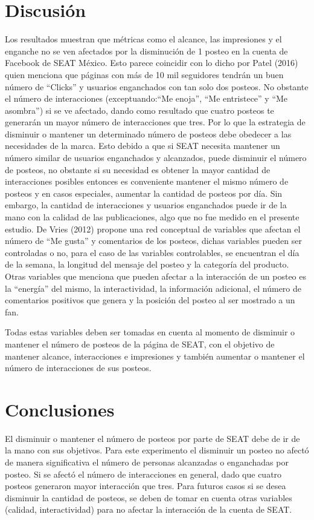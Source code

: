 \documentclass[a4paper,10pt]{article}
\begin{document}
\section{Discusión}
Los resultados muestran que métricas como el alcance, las impresiones y el enganche no
se ven afectados por la disminución de 1 posteo en la cuenta de Facebook de SEAT México. Esto parece coincidir
con lo dicho por Patel (2016) quien menciona que páginas con más de 10 mil seguidores tendrán un buen número
de ``Clicks'' y usuarios enganchados con tan solo dos posteos.
No obstante el número de interacciones (exceptuando:``Me enoja'', ``Me entristece'' y ``Me asombra'')
si se ve afectado, dando como resultado que cuatro posteos te generarán un mayor número de interacciones que tres.
Por lo que la estrategia de disminuir o mantener un determinado número  de posteos debe obedecer a las necesidades de la marca.
Esto debido a que si SEAT necesita mantener un  número similar  de usuarios enganchados y alcanzados,
puede disminuir el número de posteos, no obstante si su necesidad es obtener la mayor cantidad de interacciones posibles 
entonces es conveniente mantener el mismo número de posteos y en casos especiales, aumentar la cantidad de posteos por día.
Sin embargo, la cantidad de interacciones y usuarios enganchados puede ir de la mano con la calidad de las publicaciones, algo que 
no fue medido en el presente estudio.
De Vries (2012) propone una red conceptual  de variables que afectan el número de ``Me gusta'' y comentarios de los posteos,
dichas variables pueden ser controladas o no, para el caso de las variables controlables, se encuentran el día de la semana, 
la longitud del mensaje del posteo y la categoría del producto. Otras variables que menciona que pueden afectar
a la interacción de un posteo es la ``energía'' del mismo, la interactividad, la información adicional, el número
de comentarios positivos que genera y la posición del posteo al ser mostrado a un fan.

Todas estas variables deben ser tomadas en cuenta al momento de disminuir o mantener el número de posteos
de la página de SEAT, con el objetivo de mantener alcance, interacciones e impresiones y también aumentar o mantener
el número de interacciones de sus posteos.



\section{Conclusiones}
El disminuir o mantener el número de posteos por parte de SEAT debe de ir de la mano con sus objetivos.
Para este experimento el disminuir un posteo no afectó de manera significativa el número de personas alcanzadas o enganchadas por posteo.
Si se afectó el número de interacciones en general, dado que cuatro posteos generaron mayor interacción que tres.
Para futuros casos si se desea disminuir la cantidad de posteos, se deben de tomar en cuenta otras variables (calidad, interactividad)
para no afectar la interacción de la cuenta de SEAT. 
\end{document}
